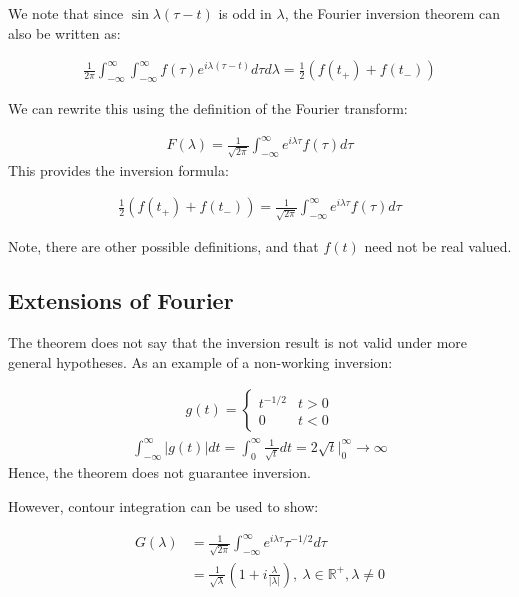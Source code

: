 \documentclass{article}
\theoremstyle{definition}
\def\R{\mathbb{R}}
\begin{document}
We note that since $\sin \lambda (\tau-t)$ is odd in $\lambda$, the Fourier inversion theorem can also be written as:

\begin{align*}
\frac{1}{2\pi} \int_{-\infty}^\infty \int_{-\infty}^\infty f(\tau) e^{i \lambda (\tau - t)}  d\tau d\lambda 
=\frac{1}{2} \left(f(t_+) + f(t_-)\right) 
\end{align*}

We can rewrite this using the definition of the Fourier transform:

\begin{align*}
F(\lambda) = \frac{1}{\sqrt{2\pi}} \int_{-\infty}^\infty e^{i \lambda \tau} f(\tau) d\tau
\end{align*}
This provides the inversion formula:

\begin{align*}
\frac{1}{2} \left(f(t_+) + f(t_-)\right) = \frac{1}{\sqrt{2\pi}} \int_{-\infty}^\infty e^{i \lambda \tau} f(\tau) d\tau
\end{align*}

Note, there are other possible definitions, and that $f(t)$ need not be real valued.

\subsection{Extensions of Fourier}
The theorem does not say that the inversion result is not valid under more general hypotheses. As an example of a non-working inversion:

\begin{align*}
g(t) = \begin{cases}
t^{-1/2} &t > 0 \\ 
0 & t < 0
\end{cases}
\end{align*}
\begin{align*}
\int_{-\infty}^{\infty} \left|g(t)\right| dt = \int_{0}^{\infty} \frac{1}{\sqrt{t}} dt = 2 \sqrt{t} |_0^\infty \to \infty 
\end{align*}
Hence, the theorem does not guarantee inversion.

However, contour integration can be used to show:

\begin{align*}
G(\lambda) &= \frac{1}{\sqrt{2 \pi }} \int_{-\infty}^{\infty} e^{i \lambda \tau } \tau^{-1/2} d\tau \\
 &=  \frac{1}{\sqrt{\lambda}} \left(1 + i \frac{\lambda}{|\lambda|}\right),\ \lambda \in \R^+, \lambda \neq 0
\end{align*}
\end{document}

